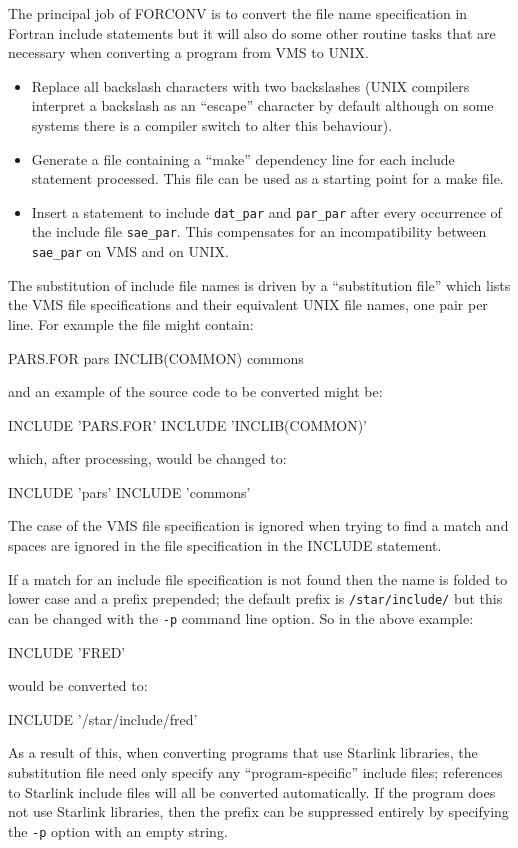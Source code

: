 \documentclass[11pt,nolof]{starlink}
\begin{document}
The principal job of FORCONV is to convert the file name specification
in Fortran include statements but it will also do some other routine tasks
that are necessary when converting a program from VMS to UNIX.
\begin{itemize}
\item Replace all backslash characters with two backslashes (UNIX
compilers interpret a backslash as an ``escape'' character by default
although on some systems there is a compiler switch to alter this
behaviour).

\item Generate a file containing a ``make'' dependency line for each
include statement processed. This file can be used as a starting point for a
make file.

\item Insert a statement to include \texttt{dat\_par} and \texttt{par\_par} after
every occurrence of the include file \texttt{sae\_par}. This compensates for an
incompatibility  between \texttt{sae\_par} on VMS and on UNIX.

\end{itemize}

The substitution of include file names is driven by a ``substitution
file'' which lists the VMS file specifications and their equivalent UNIX
file names, one pair per line. For example the file might contain:
\begin{terminalv}
PARS.FOR pars
INCLIB(COMMON) commons
\end{terminalv}
and an example of the source code to be converted might be:
\begin{terminalv}
      INCLUDE 'PARS.FOR'
      INCLUDE 'INCLIB(COMMON)'
\end{terminalv}
which, after processing, would be changed to:
\begin{terminalv}
      INCLUDE 'pars'
      INCLUDE 'commons'
\end{terminalv}
The case of the VMS file specification is ignored when trying to find a
match and spaces are ignored in the file specification in the INCLUDE
statement.

If a match for an include file specification is not found then the name
is folded to lower case and a prefix prepended; the default prefix is
\texttt{/star/include/} but this can be changed with the \texttt{-p} command line
option. So in the above example:
\begin{terminalv}
INCLUDE 'FRED'
\end{terminalv}
would be converted to:
\begin{terminalv}
INCLUDE '/star/include/fred'
\end{terminalv}
As a result of this,
when converting programs that use Starlink libraries, the substitution file
need only specify any ``program-specific'' include files; references to
Starlink include files will all be converted automatically. If the
program does not use Starlink libraries, then the prefix can be suppressed
entirely by specifying the \texttt{-p} option with an empty string.
\end{document}

